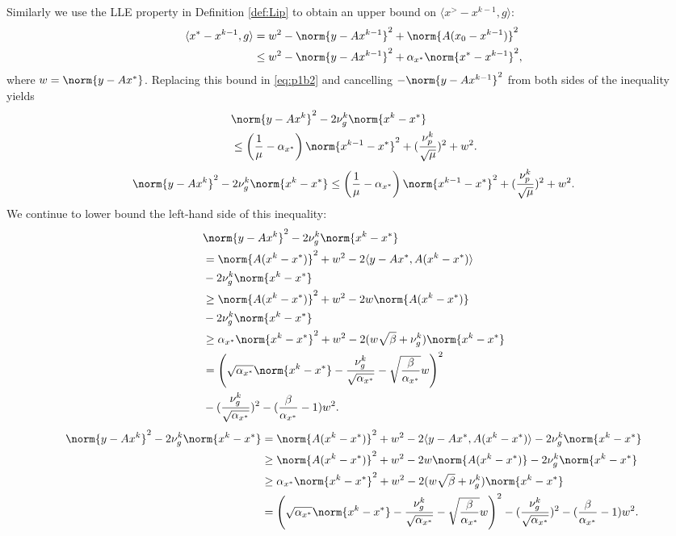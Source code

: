 Similarly we use the LLE property in Definition \ref{def:Lip} to obtain an upper bound on $ \langle x^\gt-x^{k-1},g \rangle$:
\begin{align*} 
\langle x^\gt-x^{k-1},g \rangle 	&= w^2-\norm{y-Ax^{k-1}}^2 +\norm{A(x_0-x^{k-1})}^2 \\
&\leq w^2 -\norm{y-Ax^{k-1}}^2 +\mmx\norm{x^\gt-x^{k-1}}^2,
\end{align*}
where $w=\norm{ y-Ax^\gt}$. Replacing this bound in \eqref{eq:p1b2} and cancelling $-\norm{y-Ax^{k-1}}^2$ from both sides of the inequality yields
\ifCLASSOPTIONtwocolumn
\begin{align}
&\norm{y-Ax^k}^2- 2\nug^k\norm{x^k-x^\gt}\nonumber \\ 
&\leq \left(\frac{1}{\mu}-\mmx \right)\norm{x^{k-1}-x^\gt}^2 + (\frac{\nup^k}{\sqrt\mu})^2+w^2. \label{eq:p1b3}
\end{align}
\else
\begin{align}
\norm{y-Ax^k}^2- 2\nug^k\norm{x^k-x^\gt}
\leq \left(\frac{1}{\mu}-\mmx \right)\norm{x^{k-1}-x^\gt}^2 + (\frac{\nup^k}{\sqrt\mu})^2+w^2. \label{eq:p1b3}
\end{align}
\fi
We continue to lower bound the left-hand side of this inequality:
\ifCLASSOPTIONtwocolumn
\begin{align*}
&\norm{y-Ax^k}^2- 2\nug^k\norm{x^k-x^\gt}\\
&= \norm{A(x^k-x^\gt)}^2+w^2-2\langle y-Ax^\gt, A(x^k-x^\gt)\rangle\\
&- 2\nug^k\norm{x^k-x^\gt} \\
&\geq \norm{A(x^k-x^\gt)}^2+w^2-2w \norm{A(x^k-x^\gt)}\\
&- 2\nug^k\norm{x^k-x^\gt} \\
& \geq \mmx\norm{x^k-x^\gt}^2+w^2-2(w \sqrt{\MM}+\nug^k)\norm{x^k-x^\gt}\\
&= \left(\sqrt{\mmx}\norm{x^k-x^\gt}-\frac{\nug^k}{\sqrt{\mmx}}- \sqrt{\frac{\MM}{\mmx}}w\right)^2 \\
&- (\frac{\nug^k}{\sqrt{\mmx}})^2 -(\frac{\MM}{\mmx}-1)w^2.
\end{align*}
\else
\begin{align*}
\norm{y-Ax^k}^2- 2\nug^k\norm{x^k-x^\gt}
&= \norm{A(x^k-x^\gt)}^2+w^2-2\langle y-Ax^\gt, A(x^k-x^\gt)\rangle- 2\nug^k\norm{x^k-x^\gt} \\
&\geq \norm{A(x^k-x^\gt)}^2+w^2-2w \norm{A(x^k-x^\gt)}
- 2\nug^k\norm{x^k-x^\gt} \\
& \geq \mmx\norm{x^k-x^\gt}^2+w^2-2(w \sqrt{\MM}+\nug^k)\norm{x^k-x^\gt}\\
&= \left(\sqrt{\mmx}\norm{x^k-x^\gt}-\frac{\nug^k}{\sqrt{\mmx}}- \sqrt{\frac{\MM}{\mmx}}w\right)^2 - (\frac{\nug^k}{\sqrt{\mmx}})^2 -(\frac{\MM}{\mmx}-1)w^2.
\end{align*}

